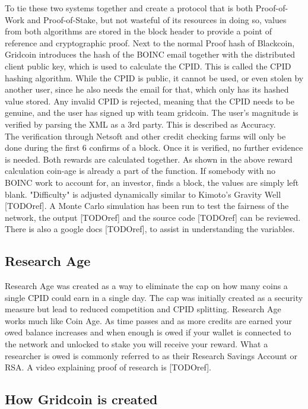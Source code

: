 To tie these two systems together and create a protocol that is both Proof-of-Work and Proof-of-Stake, but not wasteful of its resources in doing so, values from both algorithms are stored in the block header to provide a point of reference and cryptographic proof. Next to the normal Proof hash of Blackcoin, Gridcoin introduces the hash of the BOINC email together with the distributed client public key, which is used to calculate the CPID. This is called the CPID hashing algorithm. While the CPID is public, it cannot be used, or even stolen by another user, since he also needs the email for that, which only has its hashed value stored. Any invalid CPID is rejected, meaning that the CPID needs to be genuine, and the user has signed up with team gridcoin. The user's magnitude is verified by parsing the XML as a 3rd party. This is described as Accuracy.\\

The verification through Netsoft and other credit checking farms will only be done during the first 6 confirms of a block. Once it is verified, no further evidence is needed. Both rewards are calculated together. As shown in the above reward calculation coin-age is already a part of the function. If somebody with no BOINC work to account for, an investor, finds a block, the values are simply left blank. "Difficulty" is adjusted dynamically similar to Kimoto's Gravity Well [TODOref]. A Monte Carlo simulation has been run to test the fairness of the network, the output [TODOref] and the source code [TODOref] can be reviewed. There is also a google docs [TODOref], to assist in understanding the variables.

\subsection{Research Age}

Research Age was created as a way to eliminate the cap on how many coins a single CPID could earn in a single day. The cap was initially created as a security measure but lead to reduced competition and CPID splitting. Research Age works much like Coin Age. As time passes and as more credits are earned your owed balance increases and when enough is owed if your wallet is connected to the network and unlocked to stake you will receive your reward. What a researcher is owed is commonly referred to as their Research Savings Account or RSA. A video explaining proof of research is [TODOref].


\subsection{How Gridcoin is created}

